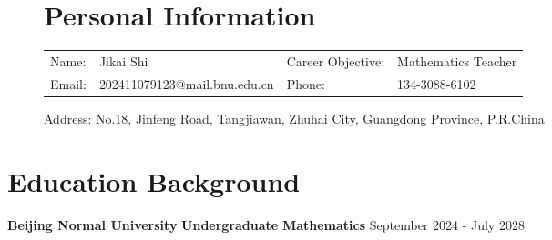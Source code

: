 	\begin{figure}[h]
			\section{\makebox[\widthof{\faAddressCard}][c]{\color{WHU_Blue}{\faAddressCard}}\quad Personal Information}
			\begin{tabular}{llll}
				Name: & Jikai Shi & \hspace*{40pt} %
				Career Objective:& Mathematics Teacher\\
				Email: & 202411079123@mail.bnu.edu.cn &\hspace*{40pt} Phone:& 134-3088-6102 \\
			\end{tabular}
			
			\hspace*{6pt}Address: \hspace*{0pt} No.18, Jinfeng Road, Tangjiawan, Zhuhai City, Guangdong Province, P.R.China
			
	\end{figure}
	\vspace{-1em}
	\vspace*{-5pt}
	\section{\makebox[\widthof{\faGraduationCap}][c]{\color{WHU_Blue}{\faGraduationCap}}\quad Education Background}
	
	
	
	{\large \textbf{Beijing Normal University}} \hspace{1.2cm} \textbf{Undergraduate} \hspace{1.2cm} \textbf{Mathematics 
	} 
	\hfill September 2024 - July 2028
	
